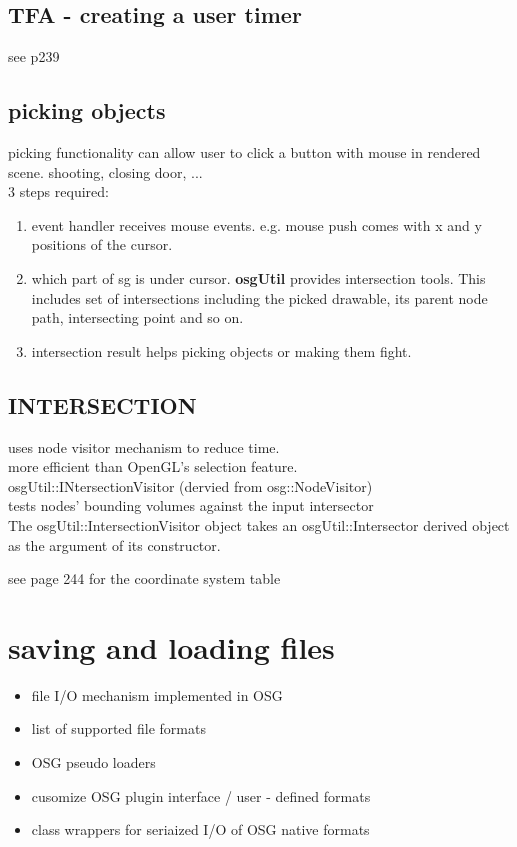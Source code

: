 \documentclass[a4paper,12pt]{book}
\begin{document}
\section{TFA - creating a user timer}
see p239

\section{picking objects}
picking functionality can allow user to click a button with mouse in rendered scene. shooting, closing door, ...\\
3 steps required:
\begin{enumerate}
\item event handler receives mouse events. e.g. mouse push comes with x and y positions of the cursor.
\item which part of sg is under cursor. \textbf{osgUtil} provides intersection tools. This includes set of intersections including the picked drawable, its parent node path, intersecting point and so on.
\item intersection result helps picking objects or making them fight.
\end{enumerate}

\section{INTERSECTION}
uses node visitor mechanism to reduce time.\\
more efficient than OpenGL's selection feature.\\
\textrightarrow osgUtil::INtersectionVisitor (dervied from osg::NodeVisitor)\\
\textrightarrow tests nodes' bounding volumes against the input intersector\\

The osgUtil::IntersectionVisitor object takes an osgUtil::Intersector derived
object as the argument of its constructor.

\textrightarrow see page 244 for the coordinate system table

\chapter{saving and loading files}
\begin{itemize}
\item file I/O mechanism implemented in OSG
\item list of supported file formats
\item OSG pseudo loaders
\item cusomize OSG plugin interface / user - defined formats
\item class wrappers for seriaized I/O of OSG native formats
\end{itemize}
\end{document}
